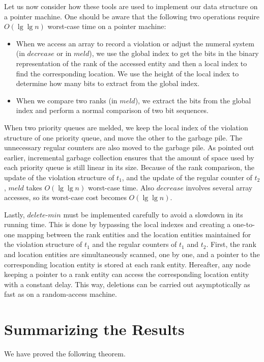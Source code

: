 \documentclass{llncs}
\newcommand{\Deletemin}{\mbox{$\mathit{delete}$\mbox{\rm -}$\mathit{min}$}}
\newcommand{\Decrease}{\mbox{$\mathit{decrease}$}}
\newcommand{\Meld}{\mbox{$\mathit{meld}$}}
\begin{document}
Let us now consider how these tools are used to implement our data
structure on a pointer machine.  One should be aware that the
following two operations require $O(\lg\lg n)$ worst-case time on a pointer machine: 
\begin{itemize}
\item When we access an array to record a violation or adjust the
  numeral system (in \Decrease{} or in \Meld{}), we use the global
  index to get the bits in the binary representation of the rank of
  the accessed entity and then a local index to find the corresponding
  location. We use the height of the local index to determine how many
  bits to extract from the global index. 
\item When we compare two ranks (in \Meld{}), we extract the bits from
  the global index and perform a normal comparison of two bit sequences. 
\end{itemize}
When two priority queues are melded, we keep the local index of the 
violation structure of one priority queue, and move the other to the garbage pile. 
The unnecessary regular counters are also moved to the garbage pile. As pointed out earlier,
incremental garbage collection ensures that the amount of space used
by each priority queue is still linear in its size.  Because of the rank
comparison, the update of the violation structure of $t_1$, and the
update of the regular counter of $t_2$, \Meld{} takes $O(\lg\lg n)$ worst-case
time. Also \Decrease{} involves several array accesses, so its
worst-case cost becomes $O(\lg\lg n)$.

Lastly, \Deletemin{} must be implemented carefully to avoid a slowdown
in its running time. This is done by bypassing the local indexes and
creating a one-to-one mapping between the rank entities and the
location entities maintained for the violation structure of $t_1$ and
the regular counters of $t_1$ and $t_2$.  First, the rank and location
entities are simultaneously scanned, one by one, and a pointer to the
corresponding location entity is stored at each rank entity.
Hereafter, any node keeping a pointer to a rank entity can access the
corresponding location entity with a constant delay.  This way,
deletions can be carried out asymptotically as fast as on a
random-access machine.


\section{Summarizing the Results}

We have proved the following theorem.
\end{document}
